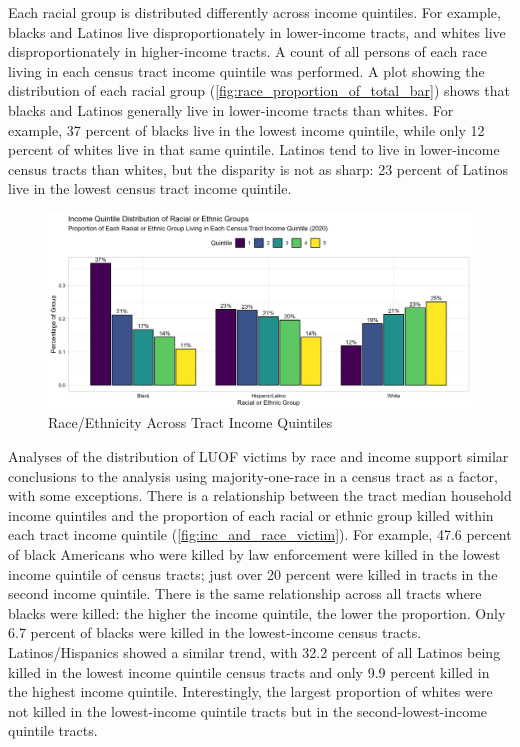 \documentclass[12pt]{article}
\begin{document}
Each racial group is distributed differently across income quintiles. For example, blacks and Latinos live disproportionately in lower-income tracts, and whites live disproportionately in higher-income tracts. A count of all persons of each race living in each census tract income quintile was performed. A plot showing the distribution of each racial group (\autoref{fig:race_proportion_of_total_bar}) shows that blacks and Latinos generally live in lower-income tracts than whites. For example, 37 percent of blacks live in the lowest income quintile, while only 12 percent of whites live in that same quintile. Latinos tend to live in lower-income census tracts than whites, but the disparity is not as sharp: 23 percent of Latinos live in the lowest census tract income quintile.

\begin{figure}[H]
  \centering
  \includegraphics[width=\linewidth]{images/total_pop_quintiles_race}
  \captionsetup{justification=centering, singlelinecheck=false, margin=2cm}
  \caption{Race/Ethnicity Across Tract Income Quintiles}
  \label{fig:total_pop_quintiles_race}
\end{figure}

Analyses of the distribution of LUOF victims by race and income support similar conclusions to the analysis using majority-one-race in a census tract as a factor, with some exceptions. There is a relationship between the tract median household income quintiles and the proportion of each racial or ethnic group killed within each tract income quintile (\autoref{fig:inc_and_race_victim}). For example, 47.6 percent of black Americans who were killed by law enforcement were killed in the lowest income quintile of census tracts; just over 20 percent were killed in tracts in the second income quintile. There is the same relationship across all tracts where blacks were killed: the higher the income quintile, the lower the proportion. Only 6.7 percent of blacks were killed in the lowest-income census tracts. Latinos/Hispanics showed a similar trend, with 32.2 percent of all Latinos being killed in the lowest income quintile census tracts and only 9.9 percent killed in the highest income quintile. Interestingly, the largest proportion of whites were not killed in the lowest-income quintile tracts but in the second-lowest-income quintile tracts.
\end{document}
